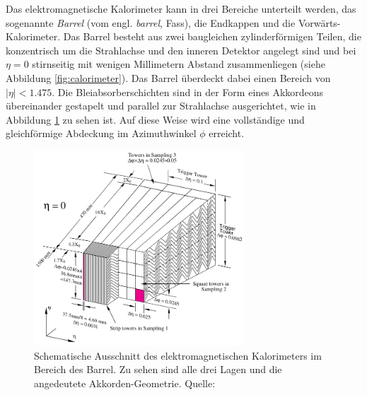 Das elektromagnetische Kalorimeter kann in drei Bereiche unterteilt werden, das
sogenannte \textit{Barrel} (vom engl. \textit{barrel}, Fass), die Endkappen
und die Vorwärts-Kalorimeter. Das Barrel besteht aus zwei baugleichen
zylinderförmigen Teilen, die konzentrisch um die Strahlachse und den inneren
Detektor angelegt sind und bei $\eta=0$ stirnseitig mit wenigen Millimetern
Abstand zusammenliegen (siehe Abbildung \ref{fig:calorimeter}). Das Barrel
überdeckt dabei einen Bereich von $|\eta| < 1.475$. Die Bleiabsorberschichten
sind in der Form eines Akkordeons übereinander gestapelt und parallel zur
Strahlachse ausgerichtet, wie in Abbildung \ref{fig:accordion} zu sehen ist.
Auf diese Weise wird eine vollständige und gleichförmige Abdeckung im
Azimuthwinkel $\phi$ erreicht.

\begin{figure}[h]
    \centering
    \includegraphics[width=0.7\textwidth]{img/accordion}
    \caption[Schematischer Ausschnitt des elektromagnetischen Kalorimeters]
        {Schematische Ausschnitt des elektromagnetischen Kalorimeters im
        Bereich des Barrel. Zu sehen sind alle drei Lagen und die angedeutete
        Akkorden-Geometrie. Quelle: \cite{ATLAS:1996ab}}
    \label{fig:accordion}
\end{figure}

